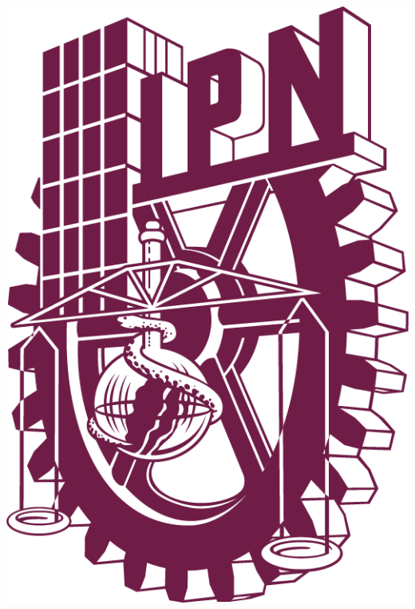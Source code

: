 
\thispagestyle{empty}	%

\begin{center}

	
	\begin{minipage}{0.48\textwidth}
		\begin{flushleft}
			\includegraphics[scale = 0.125]{images/LOGO POLI PANTONE 222 C.png}
		\end{flushleft}
	\end{minipage}

\end{center}
